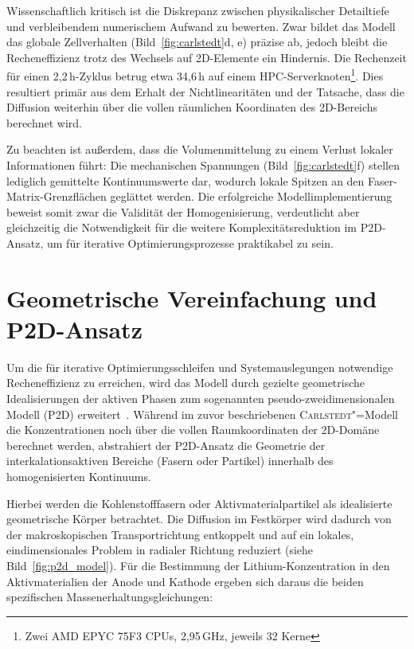 Wissenschaftlich kritisch ist die Diskrepanz zwischen physikalischer Detailtiefe und verbleibendem numerischem Aufwand zu bewerten. Zwar bildet das Modell das globale Zellverhalten (Bild~\ref{fig:carlstedt}d, e) präzise ab, jedoch bleibt die Recheneffizienz trotz des Wechsels auf 2D-Elemente ein Hindernis. Die Rechenzeit für einen 2,2\,h-Zyklus betrug etwa 34,6\,h auf einem HPC-Serverknoten\footnote{Zwei AMD EPYC 75F3 CPUs, 2,95\,GHz, jeweils 32 Kerne}. Dies resultiert primär aus dem Erhalt der Nichtlinearitäten und der Tatsache, dass die Diffusion weiterhin über die vollen räumlichen Koordinaten des 2D-Bereichs berechnet wird. 

Zu beachten ist außerdem, dass die Volumenmittelung zu einem Verlust lokaler Informationen führt: Die mechanischen Spannungen (Bild~\ref{fig:carlstedt}f) stellen lediglich gemittelte Kontinuumswerte dar, wodurch lokale Spitzen an den Faser-Matrix-Grenzflächen geglättet werden. Die erfolgreiche Modellimplementierung beweist somit zwar die Validität der Homogenisierung, verdeutlicht aber gleichzeitig die Notwendigkeit für die weitere Komplexitätsreduktion im P2D-Ansatz, um für iterative Optimierungsprozesse praktikabel zu sein.

\section{\label{sec:p2d_model}Geometrische Vereinfachung und P2D-Ansatz}

Um die für iterative Optimierungsschleifen und Systemauslegungen notwendige Recheneffizienz zu erreichen, wird das Modell durch gezielte geometrische Idealisierungen der aktiven Phasen zum sogenannten pseudo-zweidimensionalen Modell (P2D) erweitert~\cite{Newman2021}. Während im zuvor beschriebenen \textsc{Carlstedt}"=Modell die Konzentrationen noch über die vollen Raumkoordinaten der 2D-Domäne berechnet werden, abstrahiert der P2D-Ansatz die Geometrie der interkalationsaktiven Bereiche (Fasern oder Partikel) innerhalb des homogenisierten Kontinuums.

Hierbei werden die Kohlenstofffasern oder Aktivmaterialpartikel als idealisierte geometrische Körper betrachtet. Die Diffusion im Festkörper wird dadurch von der makroskopischen Transportrichtung entkoppelt und auf ein lokales, eindimensionales Problem in radialer Richtung reduziert (siehe Bild~\ref{fig:p2d_model}). Für die Bestimmung der Lithium-Konzentration in den Aktivmaterialien der Anode und Kathode ergeben sich daraus die beiden spezifischen Massenerhaltungsgleichungen:

